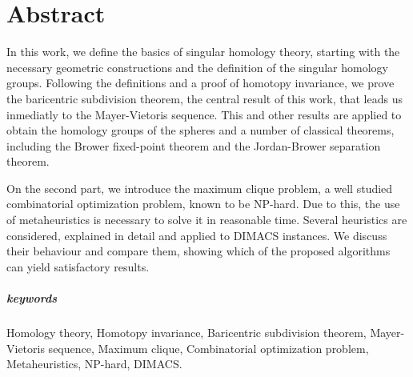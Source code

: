 \begingroup
\let\clearpage\relax
\let\cleardoublepage\relax
\let\cleardoublepage\relax

\chapter*{Abstract}

In this work, we define the basics of singular homology theory, starting with the necessary geometric constructions
and the definition of the singular homology groups. Following the definitions and a proof of homotopy invariance,
we prove the baricentric subdivision theorem, the central result of this work, that leads us inmediatly to the
Mayer-Vietoris sequence. This and other results are applied to obtain the homology groups of the spheres and a number
of classical theorems, including the Brower fixed-point theorem and the Jordan-Brower separation theorem.

On the second part, we introduce the maximum clique problem, a well studied combinatorial optimization problem, known
to be NP-hard. Due to this, the use of metaheuristics is necessary to solve it in reasonable time. Several heuristics
are considered, explained in detail and applied to DIMACS instances. We discuss their behaviour and compare them,
showing which of the proposed algorithms can yield satisfactory results.


\paragraph{keywords} Homology theory, Homotopy invariance, Baricentric subdivision theorem, Mayer-Vietoris sequence,
Maximum clique, Combinatorial optimization problem, Metaheuristics, NP-hard, DIMACS.

\vfill

\endgroup

\vfill
